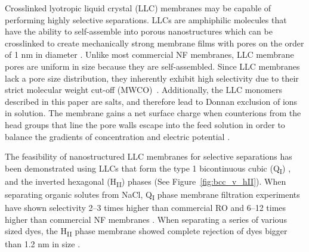 \documentclass[journal=jpcbfk,manusciprt=article]{achemso}
\begin{document}

  Crosslinked lyotropic liquid crystal (LLC) membranes may be capable of
  performing highly selective separations. LLCs are amphiphilic molecules that
  have the ability to self-assemble into porous nanostructures
  \cite{smith_ordered_1997} which can be crosslinked to create mechanically
  strong membrane films with pores on the order of 1 nm in diameter
  \cite{zhou_supported_2005}. Unlike most commercial NF membranes, LLC membrane pores
  are uniform in size because they are self-assembled. 
  Since LLC membranes lack a pore size distribution, they
  inherently exhibit high selectivity due to their strict molecular weight
  cut-off (MWCO)~\cite{zhou_supported_2005}. Additionally, the LLC monomers
  described in this paper are salts, and therefore lead to Donnan exclusion of ions
  in solution. The membrane gains a net surface charge when counterions from the head
  groups that line the pore walls escape into the feed solution in order to balance 
  the gradients of concentration and electric potential \cite{donnan_theory_1995}.    

  The feasibility of nanostructured LLC membranes for selective separations has been
  demonstrated using LLCs that form the type 1 bicontinuous cubic (Q\textsubscript{I})
  \cite{hatakeyama_water_2011,hatakeyama_nanoporous_2010,carter_glycerol-based_2012},
  and the inverted hexagonal (H\textsubscript{II}) \cite{zhou_supported_2005}
  phases (See Figure~\ref{fig:bcc_v_hII}). When separating organic solutes from
  NaCl, Q\textsubscript{I} phase membrane filtration experiments have shown
  selectivity 2--3 times higher than commercial RO and 6--12 times higher than
  commercial NF membranes \cite{dischinger_application_2017}.  When separating a
  series of various sized dyes, the H\textsubscript{II} phase membrane showed
  complete rejection of dyes bigger than 1.2 nm in size \cite{zhou_supported_2005}. 
\end{document}
